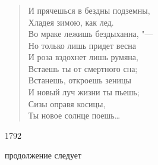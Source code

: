 \documentclass{beamer}
\begin{document}
\begin{frame}
\frametitle{}

\begin{verse}
И прячешься в бездны подземны,\\
Хладея зимою, как лед.\\
Во мраке лежишь бездыханна, "---\\
Но только лишь придет весна\\
И роза вздохнет лишь румяна,\\
Встаешь ты от смертного сна;\\
Встанешь, откроешь зеницы	\\	
И новый луч жизни ты пьешь;\\
Сизы оправя косицы,			\\	
Ты новое солнце поешь\dots
\end{verse}
1792

\end{frame}




\begin{frame}
\Huge{\centerline{продолжение следует}}
\end{frame}
\end{document}
